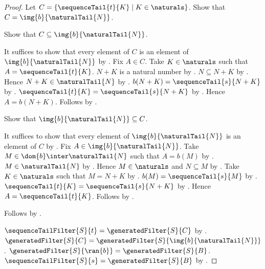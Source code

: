 \begin{proof}
    Let $C=\{\sequenceTail{t}{K}\mid K\in\naturals\}$.
    Show that $C=\img{b}{\naturalTail{N}}$.
    \begin{subproof}
        Show that $C\subseteq\img{b}{\naturalTail{N}}$.
        \begin{subproof}
            It suffices to show that every element of $C$ is an element of
                $\img{b}{\naturalTail{N}}$ by .
            Fix $A\in C$.
            Take $K\in\naturals$ such that $A=\sequenceTail{t}{K}$.
            $N+K$ is a natural number
                by .
            $N\subseteq N+K$
                by .
            Hence $N+K\in\naturalTail{N}$ by .
            $b(N+K)=\sequenceTail{s}{N+K}$
                by .
            $\sequenceTail{t}{K}=\sequenceTail{s}{N+K}$
                by .
            Hence $A=b(N+K)$.
            Follows by .
        \end{subproof}
        Show that $\img{b}{\naturalTail{N}}\subseteq C$.
        \begin{subproof}
            It suffices to show that every element of
                $\img{b}{\naturalTail{N}}$ is an element of $C$
                by .
            Fix $A\in\img{b}{\naturalTail{N}}$.
            Take $M\in\dom{b}\inter\naturalTail{N}$ such that
                $A=b(M)$ by .
            $M\in\naturalTail{N}$ by .
            Hence $M\in\naturals$ and $N\subseteq M$
                by .
            Take $K\in\naturals$ such that $M=N+K$
                by .
            $b(M)=\sequenceTail{s}{M}$
                by .
            $\sequenceTail{t}{K}=\sequenceTail{s}{N+K}$
                by .
            Hence $A=\sequenceTail{t}{K}$.
            Follows by \auto.
        \end{subproof}
        Follows by .
    \end{subproof}

    $\sequenceTailFilter{S}{t}=\generatedFilter{S}{C}$
        by .
    $\generatedFilter{S}{C}
        =\generatedFilter{S}{\img{b}{\naturalTail{N}}}$.
    $\generatedFilter{S}{\ran{b}}=\generatedFilter{S}{B}$.
    $\sequenceTailFilter{S}{s}=\generatedFilter{S}{B}$ by
        .
\end{proof}

